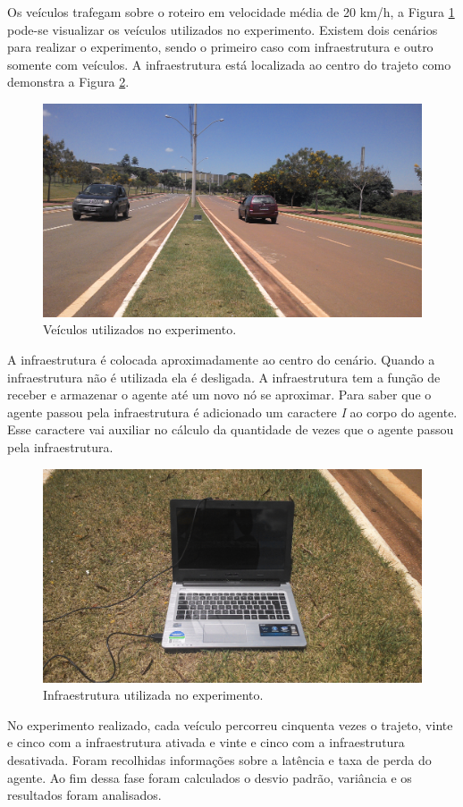 Os veículos trafegam sobre o roteiro em velocidade média de 20 km/h, a Figura \ref{fig:veiculosUtilizadoExperimento} pode-se visualizar os veículos utilizados no experimento. Existem dois cenários para realizar o experimento, sendo o primeiro caso com infraestrutura e outro somente com veículos. A infraestrutura está localizada ao centro do trajeto como demonstra a Figura \ref{fig:infraestruturaUtilizadoExperimento}.

\begin{figure}[htbp]
	\centering
	\includegraphics[scale=0.06]{metodologia/figuras/veiculosUtilizadoExperimento.jpg}
	\caption{Veículos utilizados no experimento.}
	\label{fig:veiculosUtilizadoExperimento}
\end{figure}

A infraestrutura é colocada aproximadamente ao centro do cenário. Quando a infraestrutura não é utilizada ela é desligada. A infraestrutura tem a função de receber e armazenar o agente até um novo nó se aproximar. Para saber que o agente passou pela infraestrutura é adicionado um caractere \emph{I} ao corpo do agente. Esse caractere vai auxiliar no cálculo da quantidade de vezes que o agente passou pela infraestrutura.

\begin{figure}[htbp]
	\centering
	\includegraphics[scale=0.06]{metodologia/figuras/infraestruturaUtilizadoExperimento.jpg}
	\caption{Infraestrutura utilizada no experimento.}
	\label{fig:infraestruturaUtilizadoExperimento}
\end{figure}

No experimento realizado, cada veículo percorreu cinquenta vezes o trajeto, vinte e cinco com a infraestrutura ativada e vinte e cinco com a infraestrutura desativada. Foram recolhidas informações sobre a latência e taxa de perda do agente. Ao fim dessa fase foram calculados o desvio padrão, variância e os resultados foram analisados.
